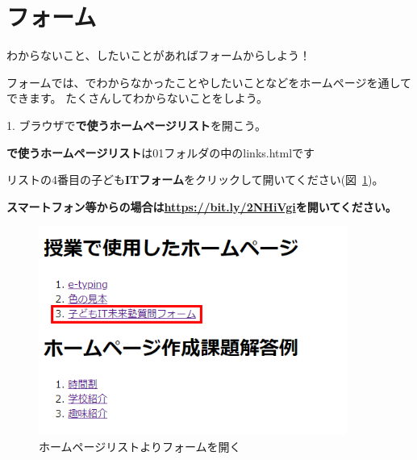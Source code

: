 \section{フォーム}
わからないこと、したいことがあればフォームからしよう！

フォームでは、でわからなかったことやしたいことなどをホームページを通してできます。
たくさんしてわからないことをしよう。

1.
ブラウザで\textbf{で使うホームページリスト}を開こう。

\textbf{で使うホームページリスト}は01フォルダの中のlinks.htmlです

リストの4番目の子ども\textbf{ITフォーム}をクリックして開いてください(図~\ref{fig:51})。


\bigskip

{\bfseries
  スマートフォン等からの場合は\url{https://bit.ly/2NHiVgi}を開いてください。}



\centering
\begin{figure}[H]
  \begin{minipage}{\textwidth}
    {\upshape
      \includegraphics[width=0.9\textwidth]{text01-img/textbook-img245.png}
      \caption{ホームページリストよりフォームを開く}\label{fig:51}
    }
  \end{minipage}  
\end{figure}


\bigskip

